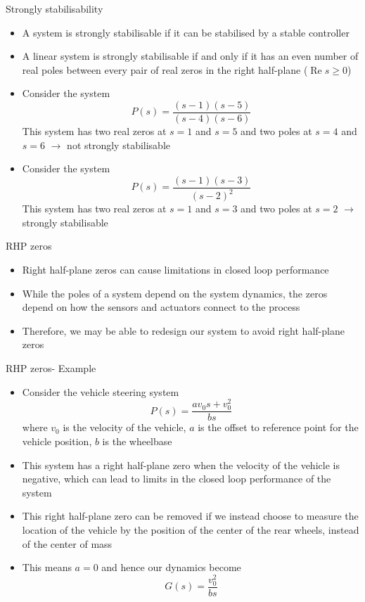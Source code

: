 \documentclass{beamer-control}
\begin{document}
\begin{frame}{Strongly stabilisability}
	\begin{itemize}
		\item A system is strongly stabilisable if it can be stabilised by a stable controller
		\item A linear system is strongly stabilisable if and only if it has an even number of real poles between every pair of real zeros in the right half-plane ($\operatorname{Re} s \geq 0$)
		\item Consider the system
		\[P(s) = \frac{(s-1)(s-5)}{(s-4)(s-6)}\]
		This system has two real zeros at $s=1$ and $s=5$ and two poles at $s=4$ and $s=6$  $\rightarrow$ not strongly stabilisable
		\item Consider the system
		\[P(s) = \frac{(s-1)(s-3)}{(s-2)^2}\]
		This system has two real zeros at $s=1$ and $s=3$ and two poles at $s=2$ $\rightarrow$ strongly stabilisable
	\end{itemize}
\end{frame}



\begin{frame}{RHP zeros}
\begin{itemize}
\item Right half-plane zeros can cause limitations in closed loop performance
\item While the poles of a system depend on the system dynamics, the zeros depend on how the sensors and actuators connect to the process
\item Therefore, we may be able to redesign our system to avoid right half-plane zeros
\end{itemize}
\end{frame}

\begin{frame}{RHP zeros- Example}
	\begin{itemize}
		\item Consider the vehicle steering system
		\[P(s) = \frac{av_0s+v_0^2}{bs}\]
		where $v_0$ is the velocity of the vehicle, $a$ is the offset to reference point for the vehicle position, $b$ is the wheelbase
		\item This system has a right half-plane zero when the velocity of the vehicle is negative, which can lead to limits in the closed loop performance of the system
		\item This right half-plane zero can be removed if we instead choose to measure the location of the vehicle by the position of the center of the rear wheels, instead of the center of mass
		\item This means $a=0$ and hence our dynamics become
		\[G(s) = \frac{v_0^2}{bs}\] 
	\end{itemize}
\end{frame}
\end{document}
